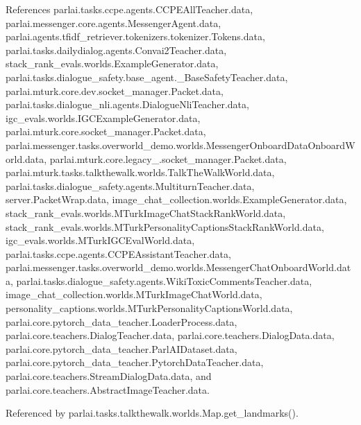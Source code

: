 References parlai.\+tasks.\+ccpe.\+agents.\+C\+C\+P\+E\+All\+Teacher.\+data, parlai.\+messenger.\+core.\+agents.\+Messenger\+Agent.\+data, parlai.\+agents.\+tfidf\+\_\+retriever.\+tokenizers.\+tokenizer.\+Tokens.\+data, parlai.\+tasks.\+dailydialog.\+agents.\+Convai2\+Teacher.\+data, stack\+\_\+rank\+\_\+evals.\+worlds.\+Example\+Generator.\+data, parlai.\+tasks.\+dialogue\+\_\+safety.\+base\+\_\+agent.\+\_\+\+Base\+Safety\+Teacher.\+data, parlai.\+mturk.\+core.\+dev.\+socket\+\_\+manager.\+Packet.\+data, parlai.\+tasks.\+dialogue\+\_\+nli.\+agents.\+Dialogue\+Nli\+Teacher.\+data, igc\+\_\+evals.\+worlds.\+I\+G\+C\+Example\+Generator.\+data, parlai.\+mturk.\+core.\+socket\+\_\+manager.\+Packet.\+data, parlai.\+messenger.\+tasks.\+overworld\+\_\+demo.\+worlds.\+Messenger\+Onboard\+Data\+Onboard\+World.\+data, parlai.\+mturk.\+core.\+legacy\+\_.\+socket\+\_\+manager.\+Packet.\+data, parlai.\+mturk.\+tasks.\+talkthewalk.\+worlds.\+Talk\+The\+Walk\+World.\+data, parlai.\+tasks.\+dialogue\+\_\+safety.\+agents.\+Multiturn\+Teacher.\+data, server.\+Packet\+Wrap.\+data, image\+\_\+chat\+\_\+collection.\+worlds.\+Example\+Generator.\+data, stack\+\_\+rank\+\_\+evals.\+worlds.\+M\+Turk\+Image\+Chat\+Stack\+Rank\+World.\+data, stack\+\_\+rank\+\_\+evals.\+worlds.\+M\+Turk\+Personality\+Captions\+Stack\+Rank\+World.\+data, igc\+\_\+evals.\+worlds.\+M\+Turk\+I\+G\+C\+Eval\+World.\+data, parlai.\+tasks.\+ccpe.\+agents.\+C\+C\+P\+E\+Assistant\+Teacher.\+data, parlai.\+messenger.\+tasks.\+overworld\+\_\+demo.\+worlds.\+Messenger\+Chat\+Onboard\+World.\+data, parlai.\+tasks.\+dialogue\+\_\+safety.\+agents.\+Wiki\+Toxic\+Comments\+Teacher.\+data, image\+\_\+chat\+\_\+collection.\+worlds.\+M\+Turk\+Image\+Chat\+World.\+data, personality\+\_\+captions.\+worlds.\+M\+Turk\+Personality\+Captions\+World.\+data, parlai.\+core.\+pytorch\+\_\+data\+\_\+teacher.\+Loader\+Process.\+data, parlai.\+core.\+teachers.\+Dialog\+Teacher.\+data, parlai.\+core.\+teachers.\+Dialog\+Data.\+data, parlai.\+core.\+pytorch\+\_\+data\+\_\+teacher.\+Parl\+A\+I\+Dataset.\+data, parlai.\+core.\+pytorch\+\_\+data\+\_\+teacher.\+Pytorch\+Data\+Teacher.\+data, parlai.\+core.\+teachers.\+Stream\+Dialog\+Data.\+data, and parlai.\+core.\+teachers.\+Abstract\+Image\+Teacher.\+data.



Referenced by parlai.\+tasks.\+talkthewalk.\+worlds.\+Map.\+get\+\_\+landmarks().

